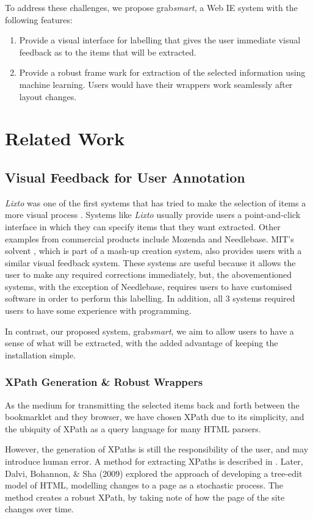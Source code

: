\documentclass[a4paper,12pt]{nurop}
\begin{document}
To address these challenges, we propose grab\textit{smart}, a Web IE system with the following 
features:
\begin{enumerate}
	\item Provide a visual interface for labelling that gives the user immediate visual feedback
	as to the items that will be extracted.
	\item Provide a robust frame wark for extraction of the selected information using machine
	learning. Users would have their wrappers work seamlessly after layout changes.
\end{enumerate}

\section{Related Work}
\subsection{Visual Feedback for User Annotation}
\textit{Lixto} was one of the first systems that has tried to make the selection of items a
more visual process \cite{Baumgartner2001}. Systems like \textit{Lixto} usually provide users
a point-and-click interface in which they can specify items that they want extracted. Other
examples from commercial products include Mozenda and Needlebase. MIT's solvent , which is part
of a mash-up creation system, also provides users with a similar visual feedback system.
	These systems are useful because it allows the user to make any required corrections
immediately, but, the abovementioned systems, with the exception of Needlebase, requires users
to have customised software in order to perform this labelling. In addition, all 3 systems
required users to have some experience with programming.

In contrast, our proposed system, grab\textit{smart}, we aim to allow users to have a sense of what will be
extracted, with the added advantage of keeping the installation simple.
\subsubsection{XPath Generation \& Robust Wrappers}
As the medium for transmitting the selected items back and forth between the bookmarklet and
they browser, we have chosen XPath due to its simplicity, and the ubiquity of XPath as a 
query language for many HTML parsers.

However, the generation of XPaths is still the responsibility of the user, and may introduce
human error. A method for extracting XPaths is described in \cite{Anton2004}.
Later, Dalvi, Bohannon, \& Sha (2009) explored the approach of developing a tree-edit model of HTML,
modelling changes to a page as a stochastic process. The method creates a robust XPath, by taking note
of how the page of the site changes over time.
\end{document}
